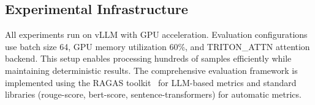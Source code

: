 \subsection{Experimental Infrastructure}

All experiments run on vLLM with GPU acceleration. Evaluation configurations use batch size 64, GPU memory utilization 60\%, and TRITON\_ATTN attention backend. This setup enables processing hundreds of samples efficiently while maintaining deterministic results. The comprehensive evaluation framework is implemented using the RAGAS toolkit~\cite{ragas} for LLM-based metrics and standard libraries (rouge-score, bert-score, sentence-transformers) for automatic metrics.

